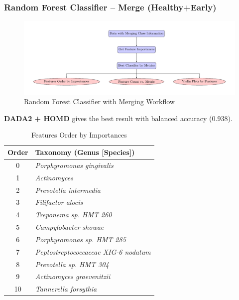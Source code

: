 \documentclass{beamer}
\begin{document}
    \begin{frame}[allowframebreaks]
        \frametitle{Random Forest Classifier -- Merge (Healthy+Early)}

        \begin{figure}
            \includegraphics[width=0.8 \linewidth]{figures/RandomForest/merge.pdf}
            \caption{Random Forest Classifier with Merging Workflow}
        \end{figure}

        \textbf{DADA2 + HOMD} gives the best result with balanced accuracy (0.938).

        \begin{table}
            \caption{Features Order by Importances}
            \begin{tabular}{c|l}
                Order & Taxonomy (Genus [Species]) \\ \hline
                0 & \textit{Porphyromonas gingivalis} \\
                1 & \textit{Actinomyces} \\
                2 & \textit{Prevotella intermedia} \\
                3 & \textit{Filifactor alocis} \\
                4 & \textit{Treponema sp. HMT 260} \\
                5 & \textit{Campylobacter showae} \\
                6 & \textit{Porphyromonas sp. HMT 285} \\
                7 & \textit{Peptostreptococcaceae XIG-6 nodatum} \\
                8 & \textit{Prevotella sp. HMT 304} \\
                9 & \textit{Actinomyces graevenitzii} \\
                10 & \textit{Tannerella forsythia} \\
            \end{tabular}
        \end{table}


\end{frame}
\end{document}
